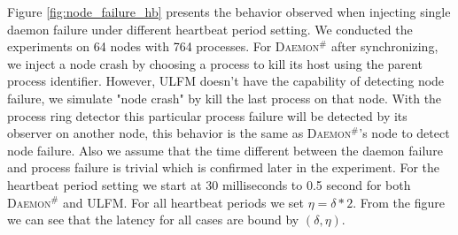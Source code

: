 \documentclass[sigconf]{acmart}
\newcommand{\ulfm}[0]{\textsc{ULFM}\xspace}
\newcommand{\ourwork}[0]{\textsc{Daemon}\ensuremath{^\#}\xspace}
\begin{document}
Figure \ref{fig:node_failure_hb} presents the behavior observed when injecting single daemon failure under different heartbeat period setting. We conducted the experiments on 64 nodes with 764 processes. For \ourwork after synchronizing, we inject a node crash by choosing a process to kill its host using the parent process identifier. However, \ulfm doesn't have the capability of detecting node failure, we simulate "node crash" by kill the last process on that node. With the process ring detector this particular process failure will be detected by its observer on another node, this behavior is the same as \ourwork's node to detect node failure. Also we assume that the time different between the daemon failure and process failure is trivial which is confirmed later in the experiment. For the heartbeat period setting we start at 30 milliseconds to 0.5 second for both \ourwork and \ulfm. For all heartbeat periods we set $ \eta = \delta * 2 $. From the figure we can see that the latency for all cases are bound by $ (\delta,\eta) $.
\end{document}
